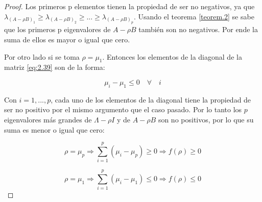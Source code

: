 \begin{proof}
Los primeros p elementos tienen la propiedad de ser no negativos, ya que $\lambda_{(A-\rho B)_1} \geq \lambda_{(A-\rho B)_2} \geq ... \geq \lambda_{(A-\rho B)_p}$. Usando el teorema \ref{teorem.2} se sabe que los primeros p eigenvalores de $A-\rho B$ también son no negativos. Por ende la suma de ellos es mayor o igual que cero. 

Por otro lado si se toma $\rho = \mu_1$. Entonces los elementos de la diagonal de la matriz \ref{eq:2.39} son de la forma:

\begin{equation}\label{eq:2.41}
   \mu_i - \mu_1  \leq 0 \quad \forall \quad i
\end{equation} 

Con $i = 1, ..., p$, cada uno de los elementos de la diagonal tiene la propiedad de ser no positivo por el mismo argumento que el caso pasado. Por lo tanto los $p$ eigenvalores más grandes de $\Lambda - \rho I$ y de $A-\rho B$ son no positivos, por lo que su suma es menor o igual que cero:

\begin{equation}\label{eq:2.42}
  \rho = \mu_p  \Rightarrow \sum_{i=1}^{p} (\mu_i- \mu_p) \geq 0 \Rightarrow f(\rho) \geq 0
\end{equation}

\begin{equation}\label{eq:2.43}
  \rho = \mu_1  \Rightarrow \sum_{i=1}^{p} (\mu_i - \mu_1) \leq 0 \Rightarrow f(\rho) \leq 0
\end{equation}

\end{proof}

